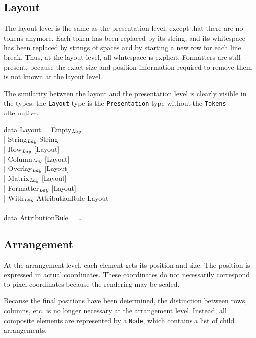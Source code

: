 \documentclass{speauth}
\begin{document}
%																
\subsection{Layout}

The layout level is the same as the presentation level, except that there are no tokens anymore. Each token has been replaced by its string, and its whitespace has been replaced by strings of spaces and by starting a new row for each line break. Thus, at the layout level, all whitespace is explicit. Formatters are still present, because the exact size and position information required to remove them is not known at the layout level.

The similarity between the layout and the presentation level is clearly visible in the types: the {\tt Layout} type is the {\tt Presentation} type without the {\tt Tokens} alternative.

\noindent
\ttfamily
\begin{tabbing}
data Layout \= = Empty$_{\mathit{Lay}}$\\
            \> | String$_{\mathit{Lay}}$ String \\
            \> | Row$_{\mathit{Lay}}$ [Layout]\\
            \> | Column$_{\mathit{Lay}}$ [Layout]\\
            \> | Overlay$_{\mathit{Lay}}$ [Layout]\\
            \> | Matrix$_{\mathit{Lay}}$ [Layout]\\
            \> | Formatter$_{\mathit{Lay}}$ [Layout]\\
            \> | With$_{\mathit{Lay}}$ AttributionRule Layout\\
\\
data AttributionRule = \dots\\
\end{tabbing}
\rmfamily


%																
\subsection{Arrangement}

At the arrangement level, each element gets its position and size. The position is expressed in actual coordinates. These coordinates do not necessarily correspond to pixel coordinates because the rendering may be scaled. 

Because the final positions have been determined, the distinction between rows, columns, etc. is no longer necessary at the arrangement level. Instead, all composite elements are represented by a {\tt Node}, which contains a list of child arrangements.  
\end{document}
